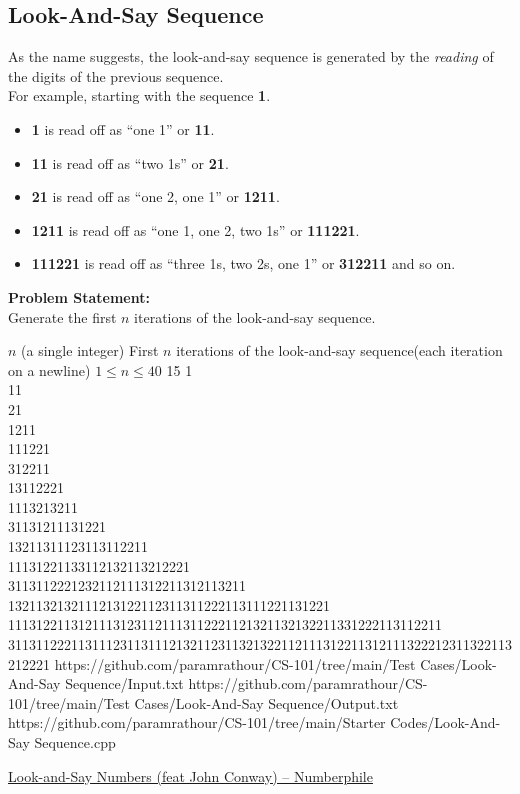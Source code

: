 \subsection{Look-And-Say Sequence}
As the name suggests, the look-and-say sequence is generated by the \emph{reading} of the digits of the previous sequence.\\%
For example, starting with the sequence \textbf{1}.
\begin{itemize}
\item \textbf{1} is read off as ``one 1'' or \textbf{11}.
\item \textbf{11} is read off as ``two 1s'' or \textbf{21}.
\item \textbf{21} is read off as ``one 2, one 1'' or \textbf{1211}.
\item \textbf{1211} is read off as ``one 1, one 2, two 1s'' or \textbf{111221}.
\item \textbf{111221} is read off as ``three 1s, two 2s, one 1'' or \textbf{312211} and so on.
\end{itemize}
\textbf{Problem Statement:}\\
Generate the first $n$ iterations of the look-and-say sequence.
\begin{testcasesMore}
	{$n$ \hfill(a single integer)}
	{First $n$ iterations of the look-and-say sequence\hfill(each iteration on a newline)}
	{$1 \leq n \leq 40$}
	{15}
	{1\\[0.5em]11\\[0.5em]21\\[0.5em]1211\\[0.5em]111221\\[0.5em]312211\\[0.5em]13112221\\[0.5em]1113213211\\[0.5em]31131211131221\\[0.5em]13211311123113112211\\[0.5em]11131221133112132113212221\\[0.5em]3113112221232112111312211312113211\\[0.5em]1321132132111213122112311311222113111221131221\\[0.5em]11131221131211131231121113112221121321132132211331222113112211\\[0.5em]311311222113111231131112132112311321322112111312211312111322212311322113212221}
	{https://github.com/paramrathour/CS-101/tree/main/Test Cases/Look-And-Say Sequence/Input.txt}
	{https://github.com/paramrathour/CS-101/tree/main/Test Cases/Look-And-Say Sequence/Output.txt}
	{https://github.com/paramrathour/CS-101/tree/main/Starter Codes/Look-And-Say Sequence.cpp}
\end{testcasesMore}
\begin{funvideo}
	\href{https://youtu.be/ea7lJkEhytA}{Look-and-Say Numbers (feat John Conway) -- Numberphile}
\end{funvideo}